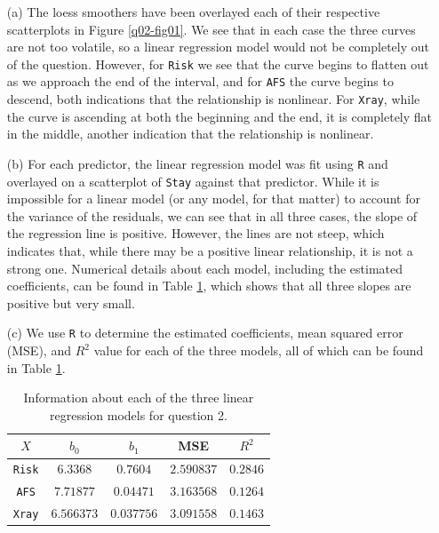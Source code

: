\documentclass[10pt]{article}
\begin{document}
\begin{itemize}
    \item[(a)] The loess smoothers have been overlayed each of their respective scatterplots in Figure \ref{q02-fig01}. We see that in each case the three 
    curves are not too volatile, so a linear regression model would not be completely out of the question. However, for \texttt{Risk} we see that the curve 
    begins to flatten out as we approach the end of the interval, and for \texttt{AFS} the curve begins to descend, both indications that the relationship is 
    nonlinear.
    For \texttt{Xray}, while the curve is ascending at both the beginning and the end, it is completely flat in the middle, another indication that the 
    relationship is nonlinear. 
    \item[(b)] For each predictor, the linear regression model was fit using \texttt{R} and overlayed on a scatterplot of \texttt{Stay} against that predictor. 
    While it is impossible for a linear model (or any model, for that matter) to account for the variance of the residuals, we can see that in all three cases,
    the slope of the regression line is positive. However, the lines are not steep, which indicates that, while there may be a positive linear relationship,
    it is not a strong one. Numerical details about each model, including the estimated coefficients, can be found in Table \ref{q02-tab01},
    which shows that all three slopes are positive but very small.
    \item[(c)] We use \texttt{R} to determine the estimated coefficients, mean squared error (MSE), and \(R^2\) value for each of the three models, all of 
    which can be found in Table \ref{q02-tab01}. 
    \begin{table}
        \centering
        \def\arraystretch{1.25}
        \begin{tabular}[ht]{ccccc} \toprule
            \(X\) & \(b_0\) & \(b_1\) & MSE & \(R^2\) \\ \midrule
            \texttt{Risk} & \(6.3368\) & \(0.7604\) & \(2.590837\) & \(0.2846\) \\
            \texttt{AFS} & \(7.71877\) & \(0.04471\) & \(3.163568\) & \(0.1264\) \\
            \texttt{Xray} & \(6.566373\) & \(0.037756\) & \(3.091558\) & \(0.1463\) \\ \bottomrule
        \end{tabular}
        \caption{Information about each of the three linear regression models for question 2.}
        \label{q02-tab01}

\end{table}
\end{itemize}
\end{document}
